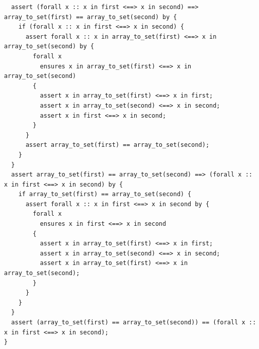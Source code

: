 \documentclass{article}
\begin{document}
\begin{lstlisting}
  assert (forall x :: x in first <==> x in second) ==> array_to_set(first) == array_to_set(second) by {
    if (forall x :: x in first <==> x in second) {
      assert forall x :: x in array_to_set(first) <==> x in array_to_set(second) by {
        forall x
          ensures x in array_to_set(first) <==> x in array_to_set(second)
        {
          assert x in array_to_set(first) <==> x in first;
          assert x in array_to_set(second) <==> x in second;
          assert x in first <==> x in second;
        }
      }
      assert array_to_set(first) == array_to_set(second);
    }
  }
  assert array_to_set(first) == array_to_set(second) ==> (forall x :: x in first <==> x in second) by {
    if array_to_set(first) == array_to_set(second) {
      assert forall x :: x in first <==> x in second by {
        forall x
          ensures x in first <==> x in second
        {
          assert x in array_to_set(first) <==> x in first;
          assert x in array_to_set(second) <==> x in second;
          assert x in array_to_set(first) <==> x in array_to_set(second);
        }
      }
    }
  }
  assert (array_to_set(first) == array_to_set(second)) == (forall x :: x in first <==> x in second);
}
\end{lstlisting}
\end{document}

